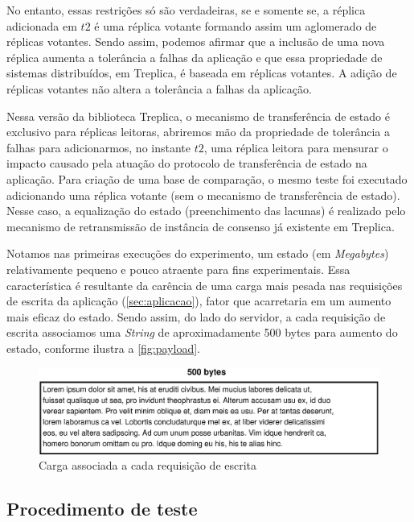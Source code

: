 No entanto, essas restrições só são verdadeiras, se e somente se, a réplica adicionada em
$t2$ é uma réplica votante formando assim um aglomerado de réplicas votantes. Sendo assim,
podemos afirmar que a inclusão de uma nova réplica aumenta a tolerância a falhas da
aplicação e que essa propriedade de sistemas distribuídos, em Treplica, é baseada em
réplicas votantes. A adição de réplicas votantes não altera a tolerância a falhas da
aplicação.

Nessa versão da biblioteca Treplica, o mecanismo de transferência de estado é exclusivo
para réplicas leitoras, abriremos mão da propriedade de tolerância a falhas para
adicionarmos, no instante $t2$, uma réplica leitora para mensurar o impacto causado pela
atuação do protocolo de transferência de estado na aplicação. Para criação de uma base de
comparação, o mesmo teste foi executado adicionando uma réplica votante (sem o mecanismo
de transferência de estado). Nesse caso, a equalização do estado (preenchimento das
lacunas) é realizado pelo mecanismo de retransmissão de instância de consenso já existente
em Treplica.

Notamos nas primeiras execuções do experimento, um estado (em \emph{Megabytes})
relativamente pequeno e pouco atraente para fins experimentais. Essa característica é
resultante da carência de uma carga mais pesada nas requisições de escrita da aplicação
(\autoref{sec:aplicacao}), fator que acarretaria em um aumento mais eficaz do estado.
Sendo assim, do lado do servidor, a cada requisição de escrita associamos uma
\emph{String} de aproximadamente 500 bytes para aumento do estado, conforme ilustra a
\autoref{fig:payload}.

\begin{figure}[ht]
  \centering
  \includegraphics[width=12cm]{conteudo/capitulos/figuras/payload.dia.eps}
  \caption{Carga associada a cada requisição de escrita}
  \label{fig:payload}
\end{figure}

\subsection{Procedimento de teste}

